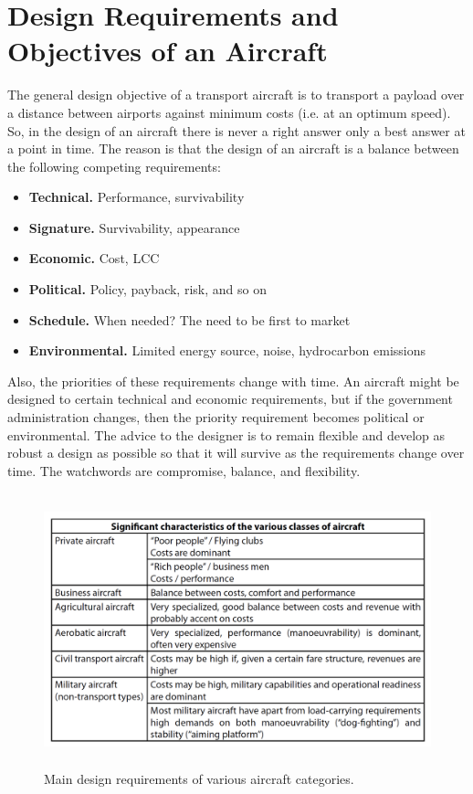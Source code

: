\section{Design Requirements and Objectives of an Aircraft}

The general design objective of a transport aircraft is to transport a payload over a distance between airports  against minimum costs (i.e. at an optimum speed).
So, in the design of an aircraft there is never a right answer only a best answer at a point in time. The reason is that the design of an aircraft is a balance between the following competing requirements:

\begin{itemize}
\item {\bfseries Technical.} Performance, survivability
\item {\bfseries Signature.} Survivability, appearance
\item {\bfseries Economic.} Cost, LCC
\item {\bfseries Political.} Policy, payback, risk, and so on
\item {\bfseries Schedule.} When needed? The need to be first to market
\item {\bfseries Environmental.} Limited energy source, noise, hydrocarbon emissions
\end{itemize}

Also, the priorities of these requirements change with time. An aircraft might be designed to certain technical and economic requirements, but if the government administration changes, then the priority requirement becomes political or environmental. The advice to the designer is to remain flexible and develop as robust a design as possible so that it will survive as the requirements change over time. The watchwords are compromise, balance, and flexibility.

\begin{figure}[H]
\centering
\includegraphics[height=7.9cm]{Immagini/tradeoff}
\caption{Main design requirements of various aircraft categories.\cite{obert2009aerodynamic}}
\label{introduction}
\end{figure}

